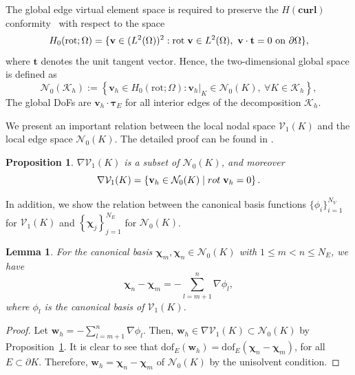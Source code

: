 \documentclass[a4paper]{article}
\theoremstyle{plain}
\newtheorem{lemma}[theorem]{Lemma}
\newtheorem{proposition}[theorem]{Proposition}
\theoremstyle{definition}
\numberwithin{equation}{section}
\newcommand{\bv}{{\bf v}}
\begin{document}
The global edge virtual element space is required to preserve the $H(\textbf{curl})$ conformity~\cite{BEI17(1),BEI17(2),BEI18} with respect to the space
\begin{equation*}
H_0(\text{rot};\Omega)=\{\bv\in(L^2(\Omega))^2: \text{rot}\;\bv\in L^2(\Omega),\ \bv\cdot\mathbf{t}=0\ \text{on}\ \partial \Omega\},
\end{equation*}
where $\mathbf{t}$ denotes the unit tangent vector.
Hence, the two-dimensional global space is defined as
\begin{equation*}
\mathcal{N}_0(\mathcal{K}_h):=\left\{\mathbf{v}_h\in H_0(\text{rot};\Omega):\left.\mathbf{v}_h\right|_K\in \mathcal{N}_0(K),\ \forall K\in \mathcal{K}_h\right\},
\end{equation*}
The global DoFs are $\mathbf{v}_h\cdot\bm{\tau}_E$ for all interior edges of the decomposition $\mathcal{K}_h$.


We present an important relation between the local nodal space $\mathcal V_1(K)$ and the local edge space $\mathcal{N}_0(K)$.
The detailed proof can be found in \cite{BEI18}.
\begin{proposition}\label{prop relation}
$\nabla \mathcal V_1(K)$ is a subset of $\mathcal{N}_0(K)$, and moreover
\begin{equation*}
\nabla \mathcal V_1(K) = \left\{\mathbf{v}_h\in \mathcal{N}_0(K)\mid \textnormal{rot}\; \mathbf{v}_h=0\right\}.
\end{equation*}
\end{proposition}


In addition, we show the relation between the canonical basis functions $\{\phi_i\}_{i=1}^{N_V}$ for $\mathcal V_1(K)$ and $\left\{ \bm{\chi}_j\right\}_{j=1}^{N_E}$ for $\mathcal{N}_0(K)$.
\begin{lemma} \label{lemma relation}
For the canonical basis $\bm{\chi}_m,\bm{\chi}_n\in \mathcal{N}_0(K)$ with $1\leq m<n\leq N_E$, we have
\begin{equation*}
\bm{\chi}_n-\bm{\chi}_m=-\sum_{l=m+1}^{n}\nabla\phi_l,
\end{equation*}
where $\phi_l$ is the canonical basis of $\mathcal{V}_1(K)$.
\end{lemma}
\begin{proof}
Let $\mathbf{w}_h=-\sum_{l=m+1}^{n}\nabla\phi_l$. Then, $\mathbf{w}_h\in \nabla \mathcal V_1(K)\subset\mathcal{N}_0(K)$ by Proposition~\ref{prop relation}.
It is clear to see that
$\text{dof}_{E}(\mathbf{w}_h)=\text{dof}_{E}(\bm{\chi}_n-\bm{\chi}_m)$,
for all $E\subset \partial K$. Therefore, $\mathbf{w}_h=\bm{\chi}_n-\bm{\chi}_m$ of $\mathcal{N}_0(K)$ by the unisolvent condition. 
\end{proof}
\end{document}

